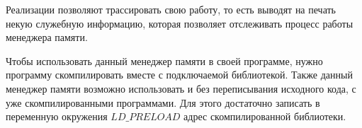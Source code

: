 \documentclass[12pt,a4paper]{article}
\begin{document}
Реализации позволяют трассировать свою работу, то есть выводят на печать некую 
служебную информацию, которая позволяет отслеживать процесс работы менеджера памяти.

Чтобы использовать данный менеджер памяти в своей программе, нужно программу скомпилировать вместе
с подключаемой библиотекой. 
Также данный менеджер памяти возможно использовать и без переписывания исходного кода,
с уже скомпилированными программами.  Для этого достаточно записать в переменную
окружения $LD\_PRELOAD$ адрес скомпилированной библиотеки.
\newpage

\nocite{knuth1}
\nocite{critover}
\nocite{malloctutorial}
\nocite{memm}


\end{document}
